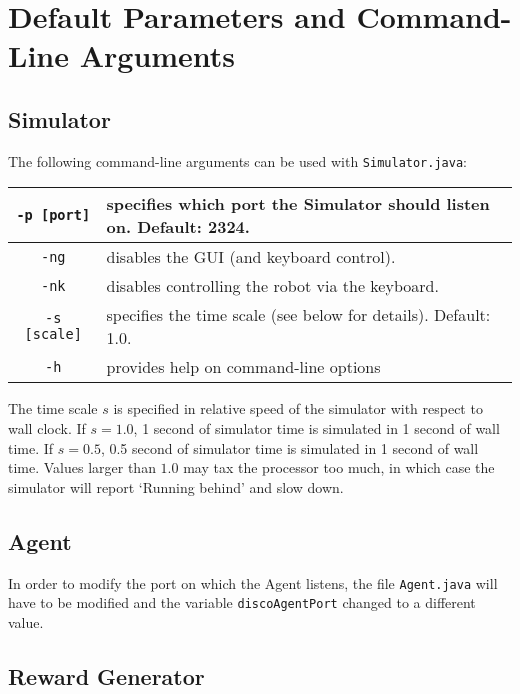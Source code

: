 \documentclass[12pt]{article}
\begin{document}
\section{Default Parameters and Command-Line Arguments\label{sec:changingDefaults}}

\subsection{Simulator}\label{subsec:simulator_parameters}

The following command-line arguments can be used with \verb+Simulator.java+:

\begin{center}
\begin{tabular}{|c|l|}
\hline
\verb+-p [port]+ & specifies which port the Simulator should listen on. Default: 2324. \\
\hline
\verb+-ng+ & disables the GUI (and keyboard control). \\
\hline
\verb+-nk+ & disables controlling the robot via the keyboard. \\
\hline
\verb+-s [scale]+ & specifies the time scale (see below for details). Default: 1.0. \\
\hline
\verb+-h+ & provides help on command-line options \\ 
\hline
\end{tabular}
\end{center}

The time scale $s$ is specified in relative speed of the simulator with respect 
to wall clock. If $s=1.0$, 1 second of simulator time is simulated in 1 second
of wall time. If $s=0.5$, 0.5 second of simulator time is simulated in 1
second of wall time. Values larger than $1.0$ may tax the processor too much,
in which case the simulator will report `Running behind' and slow down.

\subsection{Agent}

In order to modify the port on which the Agent listens, the file 
\verb+Agent.java+ will have to be modified and the variable \verb+discoAgentPort+ changed to a different value.

\subsection{Reward Generator}
\end{document}
